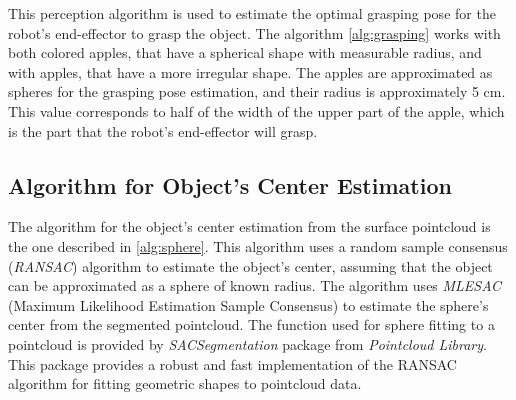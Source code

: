 This perception algorithm is used to estimate the optimal grasping pose for the robot's end-effector to grasp
the object. The algorithm \ref{alg:grasping} works with both colored apples, that have a spherical shape 
with measurable radius, and with apples, that have a more irregular shape. The apples are approximated as spheres
for the grasping pose estimation, and their radius is approximately 5 cm. This value corresponds to half of the
width of the upper part of the apple, which is the part that the robot's end-effector will grasp.

\subsection{Algorithm for Object's Center Estimation}

The algorithm for the object's center estimation from the surface pointcloud is the one described
in \ref{alg:sphere}. This algorithm uses a random sample consensus (\textit{RANSAC}) algorithm to estimate 
the object's center, assuming that the object can be approximated as a sphere of known radius.
The algorithm uses \textit{MLESAC} (Maximum Likelihood Estimation Sample Consensus) to estimate the sphere's center
from the segmented pointcloud. The function used for sphere fitting to a pointcloud is provided by
\textit{SACSegmentation} package from \textit{Pointcloud Library}. This package provides a robust and fast
implementation of the RANSAC algorithm for fitting geometric shapes to pointcloud data. 

